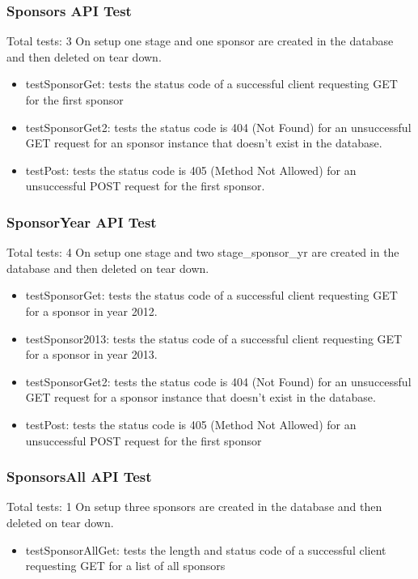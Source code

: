 \documentclass[12pt,english]{scrartcl}
\begin{document}
\subsubsection{Sponsors API Test} 
Total tests: 3
On setup one stage and one sponsor are created in the database and then deleted on tear down.
\begin{itemize}
 \item testSponsorGet: tests the status code of a successful client requesting GET for the first sponsor
 
 \item testSponsorGet2: tests the status code is 404 (Not Found) for an unsuccessful GET request for an sponsor instance
 that doesn't exist in the database.
 
 \item testPost: tests the status code is 405 (Method Not Allowed) for an unsuccessful POST request for the first sponsor.
\end{itemize}

\subsubsection{SponsorYear API Test}
Total tests: 4
On setup one stage and two stage_sponsor_yr are created in the database and then deleted on tear down.
\begin{itemize}
 \item testSponsorGet: tests the status code of a successful client requesting GET for a sponsor in year 2012.
 
 \item testSponsor2013: tests the status code of a successful client requesting GET for a sponsor in year 2013.
 
 \item testSponsorGet2: tests the status code is 404 (Not Found) for an unsuccessful GET request for a sponsor instance
 that doesn't exist in the database.
 
 \item testPost: tests the status code is 405 (Method Not Allowed) for an unsuccessful POST request for the first sponsor
 \end{itemize}
 
 \subsubsection{SponsorsAll API Test}
 Total tests: 1
 On setup three sponsors are created in the database and then deleted on tear down.
 \begin{itemize}
 
 \item testSponsorAllGet: tests the length and status code of a successful client requesting GET for a list of all 
 sponsors
 
 \end{itemize}
\end{document}
